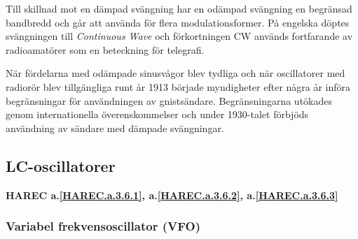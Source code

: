 Till skillnad mot en dämpad svängning har en odämpad svängning en begränsad
bandbredd och går att använda för flera modulationsformer.
På engelska döptes svängningen till \emph{Continuous Wave} och förkortningen CW
används fortfarande av radioamatörer som en beteckning för telegrafi.

När fördelarna med odämpade sinusvågor blev tydliga och när oscillatorer med
radiorör blev tillgängliga runt år 1913 började myndigheter efter några år
införa begränsningar för användningen av gnistsändare.
Begränsningarna utökades genom internationella överenskommelser och under
1930-talet förbjöds användning av sändare med dämpade svängningar.

\subsection{LC-oscillatorer}
\textbf{HAREC a.\ref{HAREC.a.3.6.1}, a.\ref{HAREC.a.3.6.2}, a.\ref{HAREC.a.3.6.3}\label{myHAREC.a.3.6.1}\label{myHAREC.a.3.6.2}\label{myHAREC.a.3.6.3}}

\subsubsection{Variabel frekvensoscillator (VFO)}

